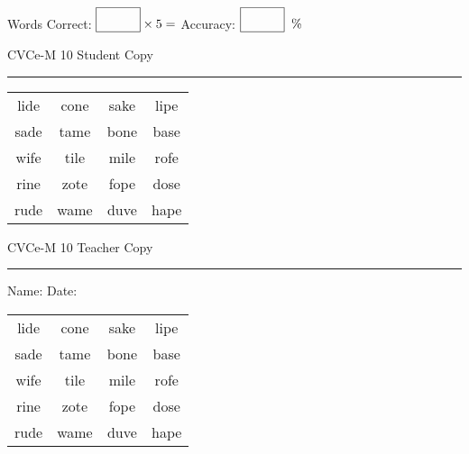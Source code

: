 \documentclass{memoir}
\begin{document}
\small

Words Correct: $\fbox{\phantom{\huge 100}} \times 5 = $ Accuracy: $\fbox{\phantom{\huge 100}}\;\; \%$ 

\vfill

\newpage


\footnotesize \noindent
CVCe-M 10 \hfill Student Copy
\smallskip
\hrule

\Large

\setlength{\tabcolsep}{14pt}
\def\arraystretch{2}

{\selectfont


\begin{vplace}[0.5]
\begin{center}
\begin{tabular}{cccc}
lide & cone & sake & lipe \\
sade & tame & bone & base \\
wife & tile & mile & rofe \\
rine & zote & fope & dose \\
rude & wame & duve & hape \\
\end{tabular}
\end{center}
\end{vplace}

}

\newpage

\footnotesize \noindent
CVCe-M 10 \hfill Teacher Copy
\smallskip
\hrule

\small

\vfill

\noindent
Name: \underline{\hspace{1.75in}} \hfill Date: \underline{\hspace{1in}}

\Large

{\selectfont


\begin{vplace}[0.5]
\begin{center}
\begin{tabular}{cccc}
lide & cone & sake & lipe \\
sade & tame & bone & base \\
wife & tile & mile & rofe \\
rine & zote & fope & dose \\
rude & wame & duve & hape \\
\end{tabular}
\end{center}
\end{vplace}



}
\end{document}
